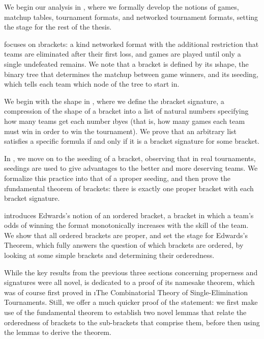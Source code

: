 {    %
    
    We begin our analysis in , where we formally develop the notions of games, matchup tables, tournament formats, and networked tournament formats, setting the stage for the rest of the thesis.
    
     focuses on \i{brackets}: a kind networked format with the additional restriction that teams are eliminated after their first loss, and games are played until only a single undefeated remains. We note that a bracket is defined by its \i{shape}, the binary tree that determines the matchup between game winners, and its \i{seeding}, which tells each team which node of the tree to start in.

    We begin with the shape in , where we define the \i{bracket signature}, a compression of the shape of a bracket into a list of natural numbers specifying how many teams get each number \i{byes} (that is, how many games each team must win in order to win the tournament). We prove that an arbitrary list satisfies a specific formula if and only if it is a bracket signature for some bracket.

    In , we move on to the \i{seeding} of a bracket, observing that in real tournaments, seedings are used to give advantages to the better and more deserving teams. We formalize this practice into that of a \i{proper seeding}, and then prove the \i{fundamental theorem of brackets}: there is exactly one proper bracket with each bracket signature.

     introduces Edwards's \cite{montana} notion of an \i{ordered bracket}, a bracket in which a team's odds of winning the format monotonically increases with the skill of the team. We show that all ordered brackets are proper, and set the stage for Edwards's Theorem, which fully answers the question of which brackets are ordered, by looking at some simple brackets and determining their orderedness.

    While the key results from the previous three sections concerning properness and signatures were all novel,  is dedicated to a proof of its namesake theorem, which was of course first proved in \i{The Combinatorial Theory of Single-Elimination Tournaments}. Still, we offer a much quicker proof of the statement: we first make use of the fundamental theorem to establish two novel lemmas that relate the orderedness of brackets to the sub-brackets that comprise them, before then using the lemmas to derive the theorem.

}
